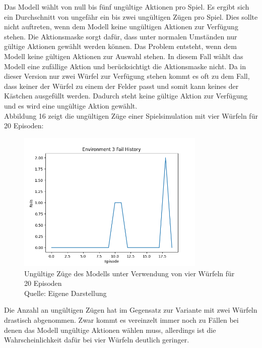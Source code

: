 Das Modell wählt von null bis fünf ungültige Aktionen pro Spiel. Es ergibt sich ein Durchschnitt von ungefähr ein bis zwei ungültigen Zügen pro Spiel. Dies sollte nicht auftreten, wenn dem Modell keine ungültigen Aktionen zur Verfügung stehen. Die Aktionsmaske sorgt dafür, dass unter normalen Umständen nur gültige Aktionen gewählt werden können. Das Problem entsteht, wenn dem Modell keine gültigen Aktionen zur Auswahl stehen. In diesem Fall wählt das Modell eine zufällige Aktion und berücksichtigt die Aktionsmaske nicht. Da in dieser Version nur zwei Würfel zur Verfügung stehen kommt es oft zu dem Fall, dass keiner der Würfel zu einem der Felder passt und somit kann keines der Kästchen ausgefüllt werden. Dadurch steht keine gültige Aktion zur Verfügung und es wird eine ungültige Aktion gewählt.\\

Abbildung 16 zeigt die ungültigen Züge einer Spielsimulation mit vier Würfeln für 20 Episoden:
\nopagebreak
\begin{figure}[H]
	\centering
	\includegraphics[width=0.8\textwidth]{Bilder/failswithfourdice} 
	\caption[Ungültige Züge des Modells unter Verwendung von vier Würfeln für 20 Episoden]{Ungültige Züge des Modells unter Verwendung von vier Würfeln für 20 Episoden\\ Quelle: Eigene Darstellung}
\end{figure}

Die Anzahl an ungültigen Zügen hat im Gegensatz zur Variante mit zwei Würfeln drastisch abgenommen. Zwar kommt es vereinzelt immer noch zu Fällen bei denen das Modell ungültige Aktionen wählen muss, allerdings ist die Wahrscheinlichkeit dafür bei vier Würfeln deutlich geringer.
